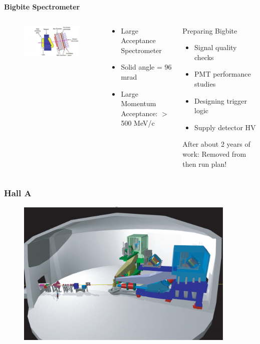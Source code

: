 \documentclass[12pt]{beamer}
\begin{document}
\begin{frame}
\centering 
\textbf{Bigbite Spectrometer}
\begin{columns}
	
	\begin{figure}
		\hspace*{-1.4cm}	\includegraphics[width=7cm]{../images/Thesis/BigBite1.png}
	\end{figure}
	\begin{block}{}
		\begin{itemize}
			\item[] \noindent Large Acceptance Spectrometer
			\item Solid angle = 96 mrad
			\item Large Momentum Acceptance: $>$ 500 MeV/c
		\end{itemize}
	\end{block}
	
	\hspace*{0.5cm}
	\begin{block}{Preparing Bigbite}
		\begin{itemize}
			\item Signal quality checks
			\item PMT performance studies
			\item Designing trigger logic
			\item Supply detector HV
		\end{itemize}
	After about 2 years of work: Removed from then run plan!
	\end{block}
\end{columns}
\end{frame}

\begin{frame}
\frametitle{Hall A}
\begin{figure}
	\includegraphics[width=10.5cm]{../images/halla.pdf}
\end{figure}
\end{frame}
\end{document}
